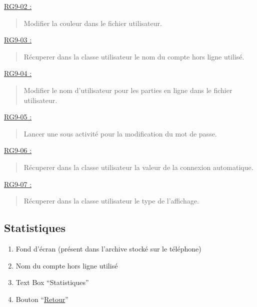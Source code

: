 \documentclass{report}
\begin{document}
			\underline{RG9-02 :}
				\begin{quote}
					Modifier la couleur dans le fichier utilisateur.\\
				\end{quote}

				
			\underline{RG9-03 :}
				\begin{quote}
					Récuperer dans la classe utilisateur le nom du compte hors ligne utilisé.\\
				\end{quote}		


			\underline{RG9-04 :}
				\begin{quote}
					Modifier le nom d'utilisateur pour les parties en ligne dans le fichier utilisateur.\\
				\end{quote}
				

			\underline{RG9-05 :}
				\begin{quote}
					Lancer une sous activité pour la modification du mot de passe.\\
				\end{quote}


			\underline{RG9-06 :}
				\begin{quote}
					Récuperer dans la classe utilisateur la valeur de la connexion automatique.\\
				\end{quote}
			 

			\underline{RG9-07 :}
				\begin{quote}
					Récuperer dans la classe utilisateur le type de l'affichage.\\
				\end{quote}
									
\newpage

	\subsection{Statistiques}
		
		\hypertarget{Statistiques}{}
		\label{Statistiques}
			
		\begin{center}
			
		\end{center}
		
		\begin{enumerate}
		  \item Fond d'écran (présent dans l'archive stocké sur le téléphone)
		  \item Nom du compte hors ligne utilisé
		  \item Text Box ``Statistiques''
		  \item Bouton ``\hyperlink{Accueil}{Retour}''
		\end{enumerate}
\end{document}
